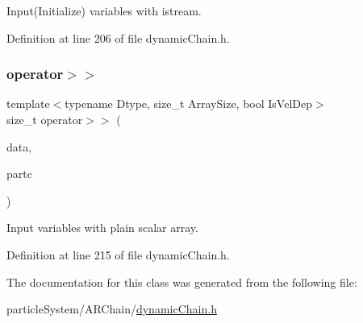 Input(\+Initialize) variables with istream. 



Definition at line 206 of file dynamic\+Chain.\+h.

\mbox{\label{class_vel_dep_chain_particles_a506a2f8ac8bbbb995d5ec6cb1f28cbb9}} 
\subsubsection{\texorpdfstring{operator$>$$>$}{operator>>}\hspace{0.1cm}{\footnotesize\ttfamily [2/2]}}
{\footnotesize\ttfamily template$<$typename Dtype, size\+\_\+t Array\+Size, bool Is\+Vel\+Dep$>$ \\
size\+\_\+t operator$>$$>$ (\begin{DoxyParamCaption}\item[{\mbox{\hyperlink{class_vel_indep_particles_a6bba8ac3f941a144214037a27ccaa119}{Dyn\+Scalar\+Array}} \&}]{data,  }\item[{\mbox{\hyperlink{class_vel_dep_chain_particles}{Vel\+Dep\+Chain\+Particles}}$<$ Dtype, Array\+Size, Is\+Vel\+Dep $>$ \&}]{partc }\end{DoxyParamCaption})\hspace{0.3cm}{\ttfamily [friend]}}



Input variables with plain scalar array. 



Definition at line 215 of file dynamic\+Chain.\+h.



The documentation for this class was generated from the following file\+:\begin{DoxyCompactItemize}
\item 
particle\+System/\+A\+R\+Chain/\mbox{\hyperlink{dynamic_chain_8h}{dynamic\+Chain.\+h}}\end{DoxyCompactItemize}
